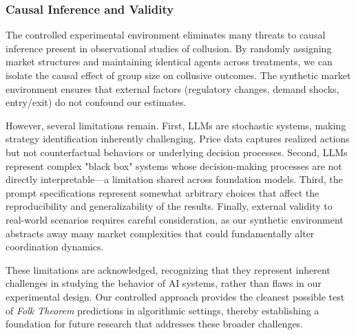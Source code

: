 \subsubsection*{Causal Inference and Validity}

The controlled experimental environment eliminates many threats to causal inference present in observational studies of collusion. By randomly assigning market structures and maintaining identical agents across treatments, we can isolate the causal effect of group size on collusive outcomes. The synthetic market environment ensures that external factors (regulatory changes, demand shocks, entry/exit) do not confound our estimates.

However, several limitations remain. First, LLMs are stochastic systems, making strategy identification inherently challenging. Price data captures realized actions but not counterfactual behaviors or underlying decision processes. Second, LLMs represent complex "black box" systems whose decision-making processes are not directly interpretable—a limitation shared across foundation models. Third, the prompt specifications represent somewhat arbitrary choices that affect the reproducibility and generalizability of the results. Finally, external validity to real-world scenarios requires careful consideration, as our synthetic environment abstracts away many market complexities that could fundamentally alter coordination dynamics.

These limitations are acknowledged, recognizing that they represent inherent challenges in studying the behavior of AI systems, rather than flaws in our experimental design. Our controlled approach provides the cleanest possible test of \emph{Folk Theorem} predictions in algorithmic settings, thereby establishing a foundation for future research that addresses these broader challenges.


